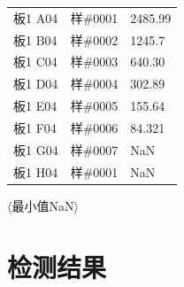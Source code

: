 \documentclass[UTF8,10pt,a4paper,fontset=fandol]{ctexart}
\newcommand{\fieldvalue}[1]{#1}
\begin{document}
\begin{tabular}{lll}
板1 A04 &%
\fieldvalue{样\#0001}
&
\fieldvalue{2485.99}
\\
板1 B04 &%
\fieldvalue{样\#0002}
&
\fieldvalue{1245.7}
\\
板1 C04 &%
\fieldvalue{样\#0003}
&
\fieldvalue{640.30}
\\
板1 D04 &%
\fieldvalue{样\#0004}
&
\fieldvalue{302.89}
\\
板1 E04 &%
\fieldvalue{样\#0005}
&
\fieldvalue{155.64}
\\
板1 F04 &%
\fieldvalue{样\#0006}
&
\fieldvalue{84.321}
\\
板1 G04 &%
\fieldvalue{样\#0007}
&
\fieldvalue{NaN}
\\
板1 H04 &%
\fieldvalue{样\#0001}
&
\fieldvalue{NaN}
\end{tabular}

\hfill $\langle$最小值\hspace{1em}NaN$\rangle$

\newpage

\section{检测结果}
\end{document}
